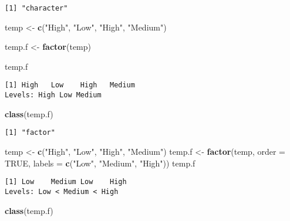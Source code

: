 \documentclass[]{book}
\newenvironment{Shaded}{\begin{snugshade}}{\end{snugshade}}
\newcommand{\KeywordTok}[1]{\textcolor[rgb]{0.13,0.29,0.53}{\textbf{#1}}}
\newcommand{\DataTypeTok}[1]{\textcolor[rgb]{0.13,0.29,0.53}{#1}}
\newcommand{\StringTok}[1]{\textcolor[rgb]{0.31,0.60,0.02}{#1}}
\newcommand{\OtherTok}[1]{\textcolor[rgb]{0.56,0.35,0.01}{#1}}
\newcommand{\NormalTok}[1]{#1}
\theoremstyle{definition}
\theoremstyle{definition}
\theoremstyle{definition}
\theoremstyle{remark}
\begin{document}
\begin{verbatim}
[1] "character"
\end{verbatim}

\begin{Shaded}
\begin{Highlighting}[]
\NormalTok{temp <-}\StringTok{ }\KeywordTok{c}\NormalTok{(}\StringTok{"High"}\NormalTok{, }\StringTok{"Low"}\NormalTok{, }\StringTok{"High"}\NormalTok{, }\StringTok{"Medium"}\NormalTok{)}

\NormalTok{temp.f <-}\StringTok{ }\KeywordTok{factor}\NormalTok{(temp)}

\NormalTok{temp.f}
\end{Highlighting}
\end{Shaded}

\begin{verbatim}
[1] High   Low    High   Medium
Levels: High Low Medium
\end{verbatim}

\begin{Shaded}
\begin{Highlighting}[]
\KeywordTok{class}\NormalTok{(temp.f)}
\end{Highlighting}
\end{Shaded}

\begin{verbatim}
[1] "factor"
\end{verbatim}

\begin{Shaded}
\begin{Highlighting}[]
\NormalTok{temp <-}\StringTok{ }\KeywordTok{c}\NormalTok{(}\StringTok{"High"}\NormalTok{, }\StringTok{"Low"}\NormalTok{, }\StringTok{"High"}\NormalTok{, }\StringTok{"Medium"}\NormalTok{)}
\NormalTok{temp.f <-}\StringTok{ }\KeywordTok{factor}\NormalTok{(temp,}
                 \DataTypeTok{order =} \OtherTok{TRUE}\NormalTok{,}
                 \DataTypeTok{labels =} \KeywordTok{c}\NormalTok{(}\StringTok{"Low"}\NormalTok{, }\StringTok{"Medium"}\NormalTok{, }\StringTok{"High"}\NormalTok{))}
\NormalTok{temp.f}
\end{Highlighting}
\end{Shaded}

\begin{verbatim}
[1] Low    Medium Low    High  
Levels: Low < Medium < High
\end{verbatim}

\begin{Shaded}
\begin{Highlighting}[]
\KeywordTok{class}\NormalTok{(temp.f)}
\end{Highlighting}
\end{Shaded}
\end{document}
